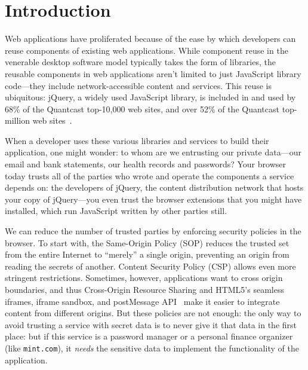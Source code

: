 \section{Introduction}
\label{sec:intro}

Web applications have proliferated because of the ease by which
developers can reuse components of existing web applications. While
component reuse in the venerable desktop software model typically takes
the form of libraries, the reusable components in web applications
aren't limited to just JavaScript library code---they include
network-accessible content and services. This reuse is ubiquitous\@:
jQuery, a widely used JavaScript library, is included in and used by
68\% of the Quantcast top-10,000 web sites, and over 52\% of the
Quantcast top-million web sites~\cite{quantcast}. 

When a developer uses these various libraries and services to
build their application, one might wonder: to whom are we entrusting our
private data---our email and bank statements, our health records and
passwords?  Your browser today trusts all of the parties who wrote and
operate the components a service depends on: the developers of jQuery,
the content distribution network that hosts your copy of
jQuery---you even trust the browser extensions that you might have
installed, which run JavaScript written by other parties still.

We can reduce the number of trusted parties by enforcing security
policies in the browser. To start with, the Same-Origin Policy (SOP) reduces
the trusted set from the entire Internet to ``merely'' a single origin,
preventing an origin from reading the secrets of another.  Content
Security Policy (CSP) allows even more stringent restrictions.
Sometimes, however, applications want to cross origin boundaries, and
thus Cross-Origin Resource Sharing and HTML5's seamless iframes, iframe
sandbox, and postMessage API~\cite{html5} make it easier to integrate
content from different origins.  But these policies are not enough: the
only way to avoid trusting a service with secret data is to never give
it that data in the first place: but if this service is a password
manager or a personal finance organizer (like {\tt mint.com}), it {\em
needs\/} the sensitive data to implement the functionality of the
application.

